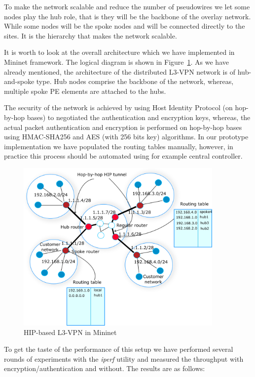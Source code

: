 To make the network scalable and reduce the number of pseudowires
we let some nodes play the hub role, that is they will be the backbone 
of the overlay network. While some nodes will be the spoke nodes
and will be connected directly to the sites. It is the hierarchy 
that makes the network scalable. 

It is worth to look at the overall architecture which we have implemented in
Mininet framework. The logical diagram is shown in Figure~\ref{fig:l3vpn}. 
As we have already mentioned, the architecture of the distributed 
L3-VPN network is of hub-and-spoke type. Hub nodes comprise the backbone of the network, whereas,
multiple spoke PE elements are attached to the hubs. 

The security of the network is achieved by using Host Identity Protocol (on hop-by-hop bases) to negotiated
the authentication and encryption keys, whereas, the actual packet authentication
and encryption is performed on hop-by-hop bases using HMAC-SHA256
and AES (with 256 bits key) algorithms. In our prototype implementation we 
have populated the routing tables manually, however, in practice this 
process should be automated using for example central controller. 

\begin{figure}[!ht]
    \centering
    \includegraphics[width=0.9\textwidth]{graphics/l3-vpn.png}
    \caption{HIP-based L3-VPN in Mininet}
    \label{fig:l3vpn}
\end{figure}

To get the taste of the performance of this setup we have performed 
several rounds of experiments with the {\it iperf} utility and measured
the throughput with encryption/authentication and without. The results 
are as follows:


